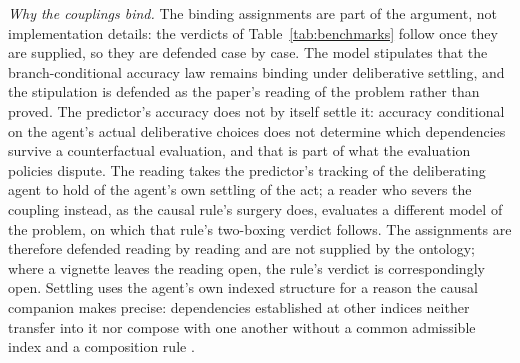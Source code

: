 \textit{Why the couplings bind.} The binding assignments are part of the argument, not implementation details: the verdicts of Table~\ref{tab:benchmarks} follow once they are supplied, so they are defended case by case. The model stipulates that the branch-conditional accuracy law remains binding under deliberative settling, and the stipulation is defended as the paper's reading of the problem rather than proved. The predictor's accuracy does not by itself settle it: accuracy conditional on the agent's actual deliberative choices does not determine which dependencies survive a counterfactual evaluation, and that is part of what the evaluation policies dispute. The reading takes the predictor's tracking of the deliberating agent to hold of the agent's own settling of the act; a reader who severs the coupling instead, as the causal rule's surgery does, evaluates a different model of the problem, on which that rule's two-boxing verdict follows. The assignments are therefore defended reading by reading and are not supplied by the ontology; where a vignette leaves the reading open, the rule's verdict is correspondingly open. Settling uses the agent's own indexed structure for a reason the causal companion makes precise: dependencies established at other indices neither transfer into it nor compose with one another without a common admissible index and a composition rule \cite{AethusCausality}.

